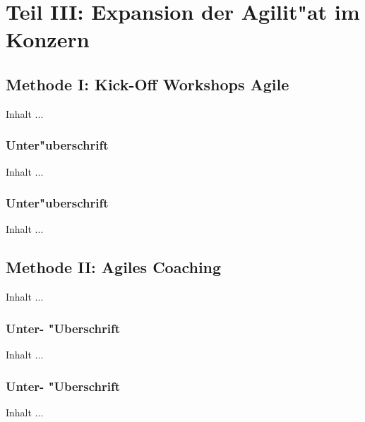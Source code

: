 
\chapter{Teil III: Expansion der Agilit"at im Konzern}
\minitoc 


\section{Methode I: Kick-Off Workshops Agile}
Inhalt ...

\subsection{Unter"uberschrift}
Inhalt ...

\subsection{Unter"uberschrift}
Inhalt ...


\section{Methode II: Agiles Coaching}
Inhalt ...

\subsection{Unter- "Uberschrift}
Inhalt ...

\subsection{Unter- "Uberschrift}
Inhalt ...
